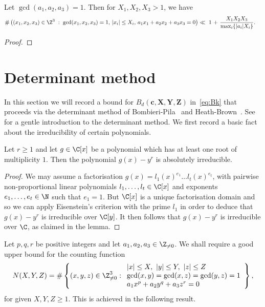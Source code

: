 \begin{theorem}\label{thm:HeathBrownGeometry}
  Let $\gcd(a_1,a_2,a_3)=1$. Then for $X_1,X_2,X_3>1$, we have
  \begin{align*}
    \#\left((x_1,x_2,x_3)\in\Z^3 \;:\; \gcd(x_1,x_2,x_3)=1,\, |x_i| \le X_i ,\, a_1x_1+a_2x_2+a_3x_3=0\right)
    \ll \ 1 \ + \ &
    \frac{X_1X_2X_3}{\max_i\{|a_i|X_i\}}.
    \end{align*}
\end{theorem}
\begin{proof}
\end{proof}

\section{Determinant method}\label{s:det}

In this section we will record a bound for $B_d(\mathbf{c},\mathbf{X},\mathbf{Y},\mathbf{Z})$ in~\eqref{eq:Bk} that proceeds via the determinant method of Bombieri-Pila~\cite{bp} and Heath-Brown~\cite{cime}. See~\cite{bl} for a gentle introduction to the determinant method.
We first record a basic fact about the irreducibility of certain polynomials.

\begin{lemma}\label{lem:EisensteinCrit}
Let $r\geq 1$ and let $g\in \C[x]$ be a polynomial
which has at least one root of multiplicity $1$.
Then the polynomial $g(x)-y^r$ is absolutely irreducible.
\end{lemma}

\begin{proof}
  We may assume a factorisation
  $g(x)=l_1(x)^{e_1}\dots l_t(x)^{e_t}$, with
  pairwise non-proportional linear polynomials $l_1,\dots,l_t\in \C[x]$ and exponents $e_1,\dots,e_t\in \N$ such that
  $e_1=1$. But ${\C}[x]$ is a unique factorisation domain and so we can apply Eisenstein's criterion
  with the prime $l_1$ in order
  to deduce that
  $g(x)-y^r$ is irreducible over $ {\C}[y]$. It then follows that
  $g(x)-y^r$ is irreducible over $ \C$, as claimed in the lemma.
\end{proof}

Let $p,q,r$ be positive integers and let $a_1,a_2,a_3\in \Z_{\neq 0}$.
We shall require a good upper bound for the counting function
\[
N(X,Y,Z)=
\#\left\{ (x,y,z)\in \Z_{\neq 0}^3:
\begin{array}{l}
|x|\leq X, ~|y|\leq Y,~|z|\leq Z\\
\gcd(x,y)=\gcd(x,z)=\gcd(y,z)=1	\\
a_1x^p+a_2 y^q+a_3 z^r=0
\end{array}
\right\},
\]
for given $X,Y,Z\geq 1$. This is achieved in the following result.

